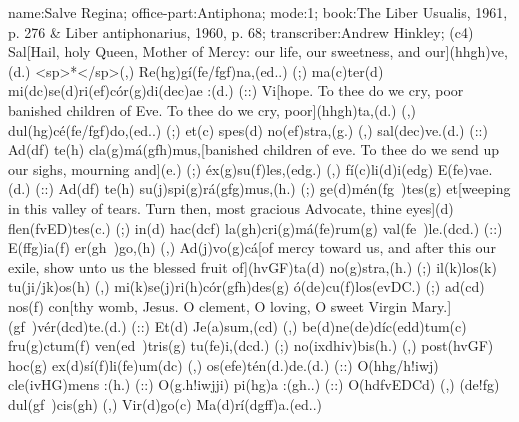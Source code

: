 name:Salve Regina;
office-part:Antiphona;
mode:1;
book:The Liber Usualis, 1961, p. 276 & Liber antiphonarius, 1960, p. 68;
transcriber:Andrew Hinkley;
(c4) Sal[Hail, holy Queen, Mother of Mercy: our life, our sweetness, and our](hhgh)ve,(d.) <sp>*</sp>(,) Re(hg)gí(fe/fgf)na,(ed..) (;) ma(c)ter(d) mi(dc)se(d)ri(ef)cór(g)di(dec)ae :(d.) (::) Vi[hope. To thee do we cry, poor banished children of Eve. To thee do we cry, poor](hhgh)ta,(d.) (,) dul(hg)cé(fe/fgf)do,(ed..) (;) et(c) spes(d) no(ef)stra,(g.) (,) sal(dec)ve.(d.) (::) Ad(df) te(h) cla(g)má(gfh)mus,[banished children of eve. To thee do we send up our sighs, mourning and](e.) (;) éx(g)su(f)les,(edg.) (,) fí(c)li(d)i(edg) E(fe)vae.(d.) (::) Ad(df) te(h) su(j)spi(g)rá(gfg)mus,(h.) (;) ge(d)mén(fg~)tes(g) et[weeping in this valley of tears. Turn then, most gracious Advocate, thine eyes](d) flen(fvED)tes(c.) (;) in(d) hac(dcf) la(gh)cri(g)má(fe)rum(g) val(fe~)le.(dcd.) (::) E(ffg)ia(f) er(gh~)go,(h) (,) Ad(j)vo(g)cá[of mercy toward us, and after this our exile, show unto us the blessed fruit of](hvGF)ta(d) no(g)stra,(h.) (;) il(k)los(k) tu(ji/jk)os(h) (,) mi(k)se(j)ri(h)cór(gfh)des(g) ó(de)cu(f)los(evDC.) (;) ad(cd) nos(f) con[thy womb, Jesus. O clement, O loving, O sweet Virgin Mary.](gf~)vér(dcd)te.(d.) (::) Et(d) Je(a)sum,(cd) (,) be(d)ne(de)díc(edd)tum(c) fru(g)ctum(f) ven(ed~)tris(g) tu(fe)i,(dcd.) (;) no(ixdhiv)bis(h.) (,) post(hvGF) hoc(g) ex(d)sí(f)li(fe)um(dc) (,) os(efe)tén(d.)de.(d.) (::) O(hhg/h!iwj) cle(ivHG)mens :(h.) (::) O(g.h!iwjji) pi(hg)a :(gh..) (::) O(hdfvEDCd) (,) (de!fg) dul(gf~)cis(gh) (,) Vir(d)go(c) Ma(d)rí(dgff)a.(ed..)